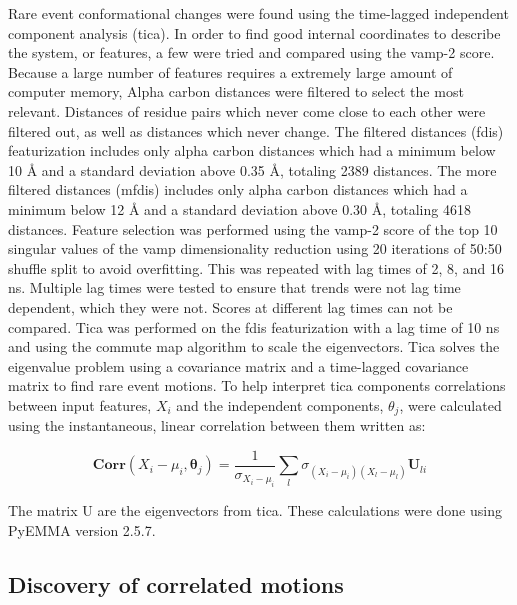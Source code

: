 \documentclass{biophys-new}
\begin{document}
Rare event conformational changes were found using the time-lagged independent component analysis (tica).\cite{perez2013identification,schwantes2013improvements} In order to find good internal coordinates to describe the system, or features, a few were tried and compared using the vamp-2 score.\cite{wu2020variational, scherer2019variational} Because a large number of features requires a extremely large amount of computer memory, Alpha carbon distances were filtered to select the most relevant. Distances of residue pairs which never come close to each other were filtered out, as well as distances which never change. The filtered distances (fdis) featurization includes only alpha carbon distances which had a minimum below 10 Å and a standard deviation above 0.35 Å, totaling 2389 distances. The more filtered distances (mfdis) includes only alpha carbon distances which had a minimum below 12 Å and a standard deviation above 0.30 Å, totaling 4618 distances. Feature selection was performed using the vamp-2 score\cite{wu2020variational, scherer2019variational} of the top 10 singular values of the vamp dimensionality reduction using 20 iterations of 50:50 shuffle split to avoid overfitting. This was repeated with lag times of 2, 8, and 16 ns. Multiple lag times were tested to ensure that trends were not lag time dependent, which they were not. Scores at different lag times can not be compared.\cite{husic2017note} Tica was performed on the fdis featurization with a lag time of 10 ns and using the commute map algorithm to scale the eigenvectors.\cite{noe2016commute} Tica solves the eigenvalue problem using a covariance matrix and a time-lagged covariance matrix to find rare event motions. To help interpret tica components correlations between input features, $X_i$ and the independent components, $\theta_j$, were calculated using the instantaneous, linear correlation between them written as:

\begin{equation}
\mathbf{Corr}(X_i - \mu_i, \mathbf{\theta}_j) = \frac{1}{\sigma_{X_i - \mu_i}}\sum_l \sigma_{(X_i - \mu_i)(X_l - \mu_l)} \mathbf{U}_{li}    
\end{equation}

The matrix U are the eigenvectors from tica. These calculations were done using PyEMMA version 2.5.7. \cite{scherer2015pyemma}

\subsection*{Discovery of correlated motions}
\end{document}

